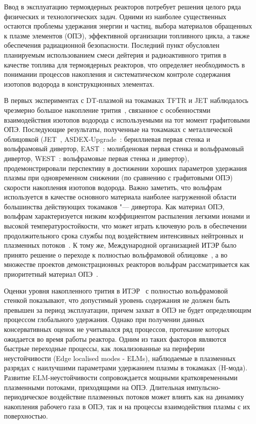 Ввод в эксплуатацию термоядерных реакторов потребует решения целого ряда физических и технологических задач. Одними из наиболее существенных остаются проблемы удержания энергии и частиц, выбора материалов обращенных к плазме элементов (ОПЭ), эффективной организации топливного цикла, а также обеспечения радиационной безопасности. Последний пункт обусловлен планируемым использованием смеси дейтерия и радиоактивного трития в качестве топлива для термоядерных реакторов, что определяет необходимость в понимании процессов накопления и систематическом контроле содержания изотопов водорода в конструкционных элементах.

В первых экспериментах с DT-плазмой на токамаках TFTR и JET наблюдалось чрезмерно большое накопление трития~\cite{Gasparyan2024}, связанное с особенностями взаимодействия изотопов водорода с используемыми на тот момент графитовыми ОПЭ. Последующие результаты, полученные на токамаках с металлической облицовкой (JET~\cite{Maggi2024,Kappatou2025}, ASDEX-Upgrade~\cite{Rohde2009}: бериллиевая первая стенка и вольфрамовый дивертор, EAST~\cite{Song2024}: молибденовая первая стенка и вольфрамовый дивертор, WEST~\cite{Shi2025}: вольфрамовые первая стенка и дивертор), продемонстрировали перспективу в достижении хороших параметров удержания плазмы при одновременном снижении (по сравнению с графитовыми ОПЭ) скорости накопления изотопов водорода. Важно заметить, что вольфрам используется в качестве основного материала наиболее нагруженной области большинства действующих токамаков "--- дивертора. Как материал ОПЭ, вольфрам характеризуется низким коэффициентом распыления легкими ионами и высокой температуростойкости, что может играть ключевую роль в обеспечении продолжительного срока службы под воздействием интенсивных нейтронных и плазменных потоков~\cite{Neu2005}. К тому же, Международной организацией ИТЭР было принято решение о переходе к полностью вольфрамовой облицовке~\cite{Barabaschi2025}, а во множестве проектов демонстрационных реакторов вольфрам рассматривается как приоритетный материал ОПЭ~\cite{Bachmann2016}.

Оценки уровня накопленного трития в ИТЭР~\cite{Roth1,Pitts2025} с полностью вольфрамовой стенкой показывают, что допустимый уровень содержания не должен быть превышен за период эксплуатации, причем захват в ОПЭ не будет определяющим процессом глобального удержания. Однако при получении данных консервативных оценок не учитывался ряд процессов, протекание которых ожидается во время работы реактора. Одним из таких факторов являются быстрые переходные процессы, как локализованные на периферии неустойчивости (Edge localised modes - ELMs), наблюдаемые в плазменных разрядах с наилучшими параметрами удержанием плазмы в токамаках (H-мода). Развитие ELM-неустойчивости сопровождается мощными кратковременными плазменными потоками, приходящими на ОПЭ. Длительная импульсно-периодическое воздействие плазменных потоков может влиять как на динамику накопления рабочего газа в ОПЭ, так и на процессы взаимодействия плазмы с их поверхностью.

